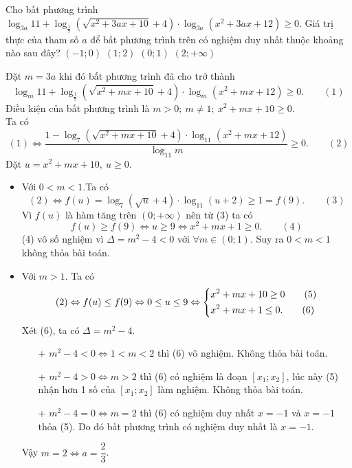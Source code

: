 \begin{ex}%
	Cho bất phương trình $\log_{3a} 11+\log_{\tfrac{1}{7}} \left(\sqrt{x^2+3ax+10}+4\right)\cdot\log_{3a} \left(x^2+3ax+12\right)\ge0$. Giá trị thực của tham số $a$ để bất phương trình trên có nghiệm duy nhất thuộc khoảng nào sau đây? 
	\choice
	{$(-1;0)$}
	{$(1;2)$}
	{\True $(0;1)$}
	{$(2;+\infty)$}
	\loigiai
	{
		Đặt $m=3a$ khi đó bất phương trình đã cho trở thành\[\log_{m} 11+\log_{\tfrac{1}{7}} \left(\sqrt{x^2+mx+10}+4\right)\cdot\log_{m} \left(x^2+mx+12\right)\ge0.\qquad(1)\] 
		Điều kiện của bất phương trình là $m>0;~ m\ne1;~ x^2+mx+10\ge0.$\\
		Ta có 
		\[(1) \Leftrightarrow \dfrac{1-\log_7 (\sqrt{x^2+mx+10}+4)\cdot\log_{11} (x^2+mx+12) }{\log_{11} m}\ge0.\qquad(2)\]
		Đặt $u=x^2+mx+10,~u\ge0$.
		\begin{itemize}
			\item Với $0<m<1$.Ta có
			\[(2) \Leftrightarrow f(u)=\log_7 (\sqrt{u}+4)\cdot\log_{11} (u+2)\ge1=f(9). \qquad(3)\]
			Vì $f(u)$ là hàm tăng trên $(0;+\infty)$ nên từ (3) ta có \[f(u)\ge f(9)\Leftrightarrow u\ge9 \Leftrightarrow x^2+mx+1\ge0. \qquad(4)\]
			(4) vô số nghiệm vì  $\Delta=m^2-4<0$ với $\forall m \in (0;1)$. Suy ra $0<m<1$ không thỏa bài toán.
			\item Với $m>1$. Ta có
			\[(2) \Leftrightarrow f(u)\le f(9) \Leftrightarrow 0\le u \le 9 \Leftrightarrow \left\{\begin{aligned}&x^2+mx+10\ge 0\qquad(5)\\&x^2+mx+1\le0. \qquad(6)\end{aligned}\right.\]
			Xét (6), ta có $\Delta=m^2-4$.
			\begin{itemize}
				\item[+] $m^2-4<0\Leftrightarrow 1<m<2$ thì (6) vô nghiệm. Không thỏa bài toán. 
				\item[+] $m^2-4>0\Leftrightarrow m>2$ thì (6) có nghiệm là đoạn $[x_1;x_2]$, lúc này (5) nhận hơn 1 số của $[x_1;x_2]$ làm nghiệm. Không thỏa bài toán. %
				\item[+] $m^2-4=0\Leftrightarrow m=2$ thì (6) có nghiệm duy nhất $x=-1$ và $x=-1$ thỏa (5). Do đó bất phương trình có nghiệm duy nhất là $x=-1$.
			\end{itemize}
			Vậy  $m=2 \Leftrightarrow a=\dfrac{2}{3}$.
		\end{itemize}
	}
\end{ex}

